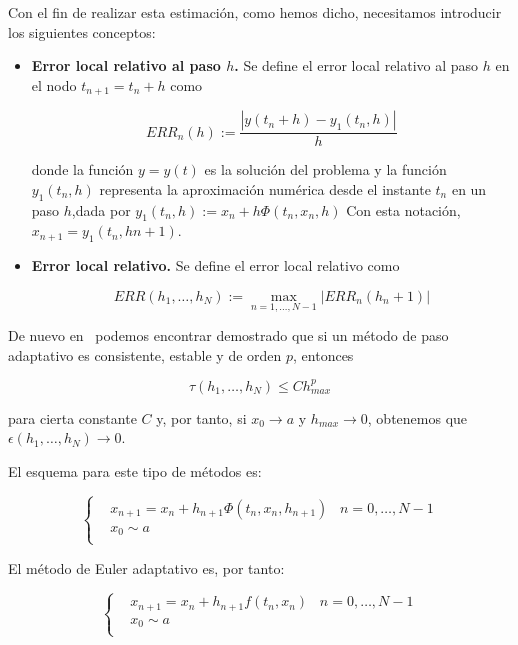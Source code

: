 Con el fin de realizar esta estimación, como hemos dicho, necesitamos introducir
los siguientes conceptos:

\begin{itemize}

		\item \textbf{Error local relativo al paso $h$.} Se define el error local relativo
				al paso $h$ en el nodo $t_{n+1} = t_n + h$ como 

				\begin{equation}
						ERR_n(h) := \frac{|y(t_n + h) - y_1(t_n,h)|}{h}	
				\end{equation}

				donde la función $y = y(t)$ es la solución del problema y la
				función $y_1(t_n,h)$ representa la aproximación numérica desde
				el instante $t_n$ en un paso $h$,dada por $y_1(t_n,h) :=  x_n +
				h\Phi (t_n,x_n,h)$ Con esta notación, $x_{n+1} = y_1(t_n,hn+1)$.

		\item \textbf{Error local relativo.} Se define el error local relativo
				como 

				\begin{equation}
						ERR(h_1,\ldots,h_N):=\max_{n=1,\ldots,N-1}|ERR_n(h_n+1)|	
				\end{equation}

\end{itemize}

De nuevo en~\citet{ANNU} podemos encontrar demostrado que si un método de paso
adaptativo es consistente, estable y de orden $p$, entonces

\[\tau(h_1,\ldots,h_N) \le Ch_{max}^p\]

para cierta constante $C$ y, por tanto, si $x_0\to a$ y $h_{max}\to 0$, obtenemos que $\epsilon(h_1,\ldots,h_N)\to 0$.

El esquema para este tipo de métodos es:

\begin{equation}
		\left\{
		\begin{aligned}
			& x_{n+1} = x_n + h_{n+1}\Phi(t_n,x_n,h_{n+1}) \;\;\; n= 0,\ldots,N-1 \\
			& x_0 \sim a \\
		\end{aligned}
		\right.
\end{equation}

El método de Euler adaptativo es, por tanto:

\begin{equation}
		\left\{
		\begin{aligned}
			& x_{n+1} = x_n + h_{n+1}f(t_n,x_n) \;\;\; n= 0,\ldots,N-1 \\
			& x_0 \sim a \\
		\end{aligned}
		\right.
\end{equation}

